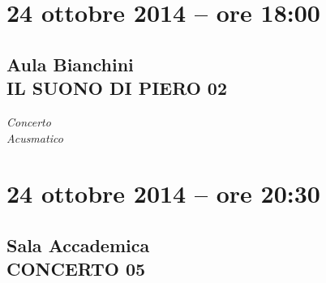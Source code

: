 \documentclass[8pt, twoside, a5paper]{extreport}
\begin{document}
\begin{Parallel}[c]{0.47\textwidth}{0.47\textwidth}
	\ParallelPar
	\clearpage


\section*{24 ottobre 2014 -- ore 18:00}
\subsection*{\textsf{Aula Bianchini\\
	{\small IL SUONO DI PIERO 02\\}}}

{\fontsize{40}{40}\selectfont \textit{Concerto\\ Acusmatico}}
\bigskip


\section*{}
	
	


	\ParallelPar
	\clearpage


\section*{24 ottobre 2014 -- ore 20:30}
\subsection*{\textsf{Sala Accademica\\
	{\small CONCERTO 05\\}}}


\end{Parallel}
\end{document}
